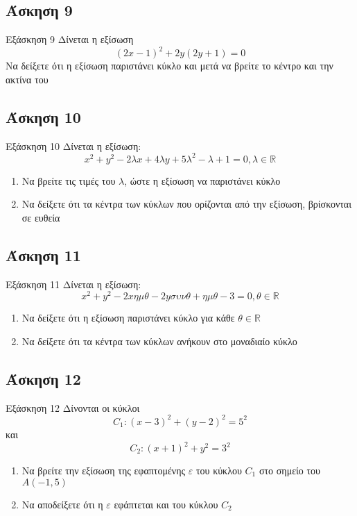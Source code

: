 \documentclass[greek]{beamer}
\begin{document}
\subsection{Άσκηση 9}
\begin{frame}[label=Άσκηση9,t]{Εξάσκηση 9}
  Δίνεται η εξίσωση
  $$(2x-1)^2+2y(2y+1)=0$$
  Να δείξετε ότι η εξίσωση παριστάνει κύκλο και μετά να βρείτε το κέντρο και την ακτίνα του

\end{frame}

\subsection{Άσκηση 10}
\begin{frame}[label=Άσκηση10,t]{Εξάσκηση 10}
  Δίνεται η εξίσωση:
  $$x^2+y^2-2λx+4λy+5λ^2-λ+1=0,λ\in\mathbb{R}$$
  \begin{enumerate}
    \item<1-> Να βρείτε τις τιμές του $λ$, ώστε η εξίσωση να παριστάνει κύκλο
    \item<2-> Να δείξετε ότι τα κέντρα των κύκλων που ορίζονται από την εξίσωση, βρίσκονται σε ευθεία
  \end{enumerate}

\end{frame}

\subsection{Άσκηση 11}
\begin{frame}[label=Άσκηση11,t]{Εξάσκηση 11}
  Δίνεται η εξίσωση:
  $$x^2+y^2-2xημθ-2yσυνθ+ημθ-3=0,θ\in\mathbb{R}$$
  \begin{enumerate}
    \item<1-> Να δείξετε ότι η εξίσωση παριστάνει κύκλο για κάθε $θ\in\mathbb{R}$
    \item<2-> Να δείξετε ότι τα κέντρα των κύκλων ανήκουν στο μοναδιαίο κύκλο
  \end{enumerate}

\end{frame}

\subsection{Άσκηση 12}
\begin{frame}[label=Άσκηση12,t]{Εξάσκηση 12}
  Δίνονται οι κύκλοι
  $$C_1:(x-3)^2+(y-2)^2=5^2$$
  και
  $$C_2:(x+1)^2+y^2=3^2$$
  \begin{enumerate}
    \item<1-> Να βρείτε την εξίσωση της εφαπτομένης $ε$ του κύκλου $C_1$ στο σημείο του $Α(-1,5)$
    \item<2-> Να αποδείξετε ότι η $ε$ εφάπτεται και του κύκλου $C_2$
  \end{enumerate}

\end{frame}
\end{document}
